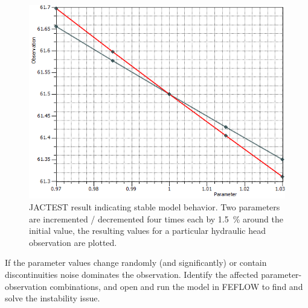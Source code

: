 \begin{figure}
	\center
	\includegraphics[width=\columnwidth]{figures/jactestResult.png}
\caption{JACTEST result indicating stable model behavior. Two parameters are incremented / decremented four times each by 1.5~\% around the initial value, the resulting values for a particular hydraulic head observation are plotted.}
\label{fig:fepest:jactestResult}
\end{figure}

If the parameter values change randomly (and significantly) or contain discontinuities noise dominates the observation. Identify the affected parameter-observation combinations, and open and run the model in FEFLOW to find and solve the instability issue.